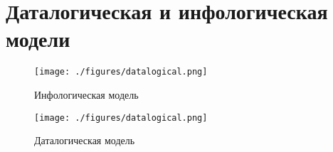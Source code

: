 \section{Даталогическая и инфологическая модели}

\begin{figure}[h!]
  \centering
  \texttt{[image: ./figures/datalogical.png]}
  \caption{Инфологическая модель}
\end{figure}

\begin{figure}[h!]
  \centering
  \texttt{[image: ./figures/datalogical.png]}
  \caption{Даталогическая модель}
\end{figure}
\clearpage


